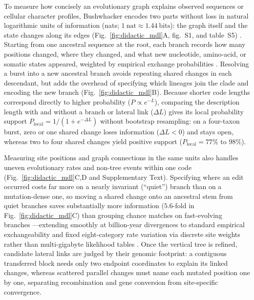 \documentclass[12pt]{article}
\begin{document}
To measure how concisely an evolutionary graph explains observed sequences or cellular character profiles, Bushwhacker encodes two parts without loss in natural logarithmic units of information (nats; $1~\mathrm{nat} \approx 1.44~\mathrm{bits}$): the graph itself and the state changes along its edges (Fig.~\ref{fig:didactic_mdl}A, fig.~S1, and table~S5) \cite{methods}. Starting from one ancestral sequence at the root, each branch records how many positions changed, where they changed, and what new nucleotide, amino-acid, or somatic states appeared, weighted by empirical exchange probabilities \cite{le2008improved}. Resolving a burst into a new ancestral branch avoids repeating shared changes in each descendant, but adds the overhead of specifying which lineages join the clade and encoding the new branch (Fig.~\ref{fig:didactic_mdl}B). Because shorter code lengths correspond directly to higher probability ($P \propto e^{-L}$), comparing the description length with and without a branch or lateral link ($\Delta L$) gives its local probability support $P_{\mathrm{local}} = 1 / (1 + e^{-\Delta L})$ without bootstrap resampling: on a four-taxon burst, zero or one shared change loses information ($\Delta L < 0$) and stays open, whereas two to four shared changes yield positive support ($P_{\mathrm{local}} = 77\%$ to $98\%$).

Measuring site positions and graph connections in the same units also handles uneven evolutionary rates and non-tree events within one code (Fig.~\ref{fig:didactic_mdl}C,D and Supplementary Text). Specifying where an edit occurred costs far more on a nearly invariant (``quiet'') branch than on a mutation-dense one, so moving a shared change onto an ancestral stem from quiet branches saves substantially more information ($5.6$-fold in Fig.~\ref{fig:didactic_mdl}C) than grouping chance matches on fast-evolving branches \cite{felsenstein1981evolutionary}---extending smoothly at billion-year divergences to standard empirical exchangeability and fixed eight-category rate variation \cite{yang1994maximum,le2008improved,rissanen1983universal} via discrete site weights rather than multi-gigabyte likelihood tables \cite{methods}. Once the vertical tree is refined, candidate lateral links are judged by their genomic footprint: a contiguous transferred block needs only two endpoint coordinates to explain its linked changes, whereas scattered parallel changes must name each mutated position one by one, separating recombination and gene conversion from site-specific convergence.
\end{document}
